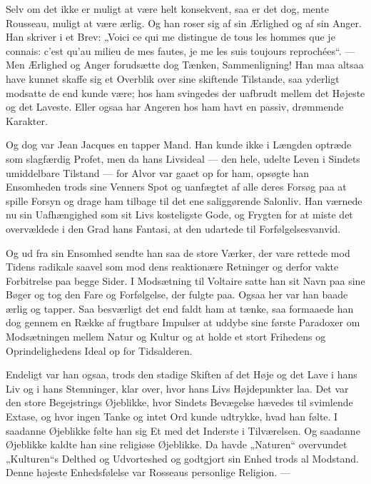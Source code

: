 \documentclass[12pt,a4paper,openany]{book}
\newcommand{\opage}[1]{\marginnote{\footnotesize\textit{[#1]}}}
\begin{document}
Selv om det ikke er muligt at være helt konsekvent, saa
er det dog, mente Rousseau, muligt at være ærlig. Og han roser
\setcounter{footnote}{0}%
\opage{144}sig af sin Ærlighed og af sin Anger. Han skriver i et Brev:
„Voici ce qui me distingue de tous les hommes que je connais:
c’est qu’au milieu de mes fautes, je me les suis toujours
reprochées“. --- Men Ærlighed og Anger forudsætte dog Tænken, Sammenligning! Han maa altsaa have kunnet skaffe sig
et Overblik over sine skiftende Tilstande, saa yderligt modsatte
de end kunde være; hos ham svingedes der uafbrudt mellem
det Højeste og det Laveste. Eller ogsaa har Angeren hos ham
havt en passiv, drømmende Karakter.

Og dog var Jean Jacques en tapper Mand. Han kunde ikke
i Længden optræde som slagfærdig Profet, men da hans Livsideal
--- den hele, udelte Leven i Sindets umiddelbare Tilstand
--- for Alvor var gaaet op for ham, opsøgte han Ensomheden
trods sine Venners Spot og uanfægtet af alle deres Forsøg
paa at spille Forsyn og drage ham tilbage til det ene saliggørende
Salonliv. Han værnede nu sin Uafhængighed som sit Livs
kosteligste Gode, og Frygten for at miste det overvældede i
den Grad hans Fantasi, at den udartede til Forfølgelsesvanvid.

Og ud fra sin Ensomhed sendte han saa de store Værker,
der vare rettede mod Tidens radikale saavel som mod dens reaktionære
Retninger og derfor vakte Forbitrelse paa begge Sider.
I Modsætning til Voltaire satte han sit Navn paa sine Bøger og
tog den Fare og Forfølgelse, der fulgte paa. Ogsaa her var han
baade ærlig og tapper. Saa besværligt det end faldt ham at
tænke, saa formaaede han dog gennem en Række af frugtbare
Impulser at uddybe sine første Paradoxer om Modsætningen
mellem Natur og Kultur og at holde et stort Frihedens og Oprindelighedens
Ideal op for Tidsalderen.

Endeligt var han ogsaa, trods den stadige Skiften af det
Høje og det Lave i hans Liv og i hans Stemninger, klar over,
hvor hans Livs Højdepunkter laa. Det var den store Begejstrings
Øjeblikke, hvor Sindets Bevægelse hævedes til svimlende Extase,
og hvor ingen Tanke og intet Ord kunde udtrykke, hvad han
følte. I saadanne Øjeblikke følte han sig Et med det Inderste
i Tilværelsen. Og saadanne Øjeblikke kaldte han sine religiøse
Øjeblikke. Da havde „Naturen“ overvundet „Kulturen“s Delthed
\setcounter{footnote}{0}%
\opage{145}og Udvorteshed og godtgjort sin Enhed trods al Modstand. Denne
højeste Enhedsfølelse var Rosseaus personlige Religion. ---
\end{document}
